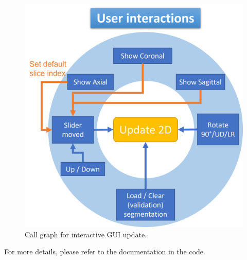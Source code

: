 \begin{figure}[h]
	\centering
	\includegraphics[height=.5\linewidth]{figures/call_graph.png}
	\caption{Call graph for interactive GUI update.}
\end{figure}

For more details, please refer to the documentation in the code.